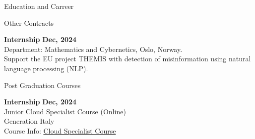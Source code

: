 \documentclass{resume} %
\begin{document}
\begin{rSection}{Education and Carreer}


%
%


        \begin{rSubsection2}{Other Contracts}

            \item\textbf{ Internship }\hfill \textbf{Dec, 2024}
            \\Department: Mathematics and Cybernetics, Oslo, Norway.
            \\Support the EU project THEMIS with detection of misinformation using natural language processing (NLP).

        \end{rSubsection2}

        \begin{rSubsection2}{Post Graduation Courses}

            \item\textbf{ Internship }\hfill \textbf{Dec, 2024}
            \\ Junior Cloud Specialist Course (Online)
            \\ Generation Italy
            \\ Course Info: \href{https://italy.generation.org/programs/cloud-specialist/}{Cloud Specialist Course}

        \end{rSubsection2}

    \end{rSection}
\end{document}
